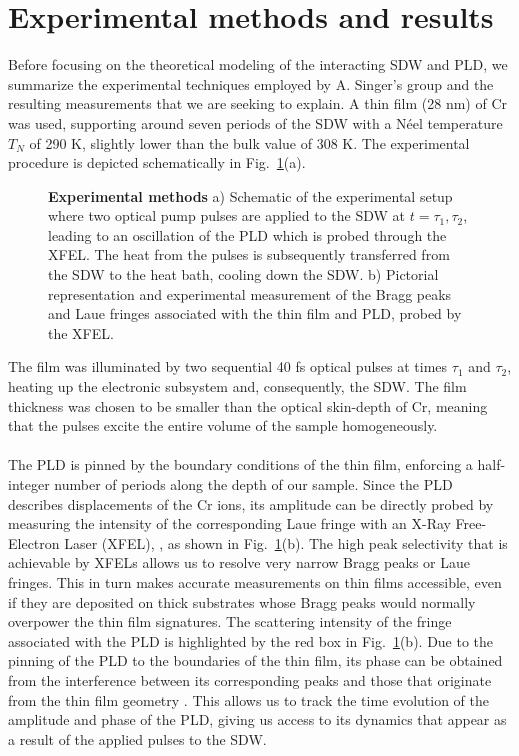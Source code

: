 \section{Experimental methods and results \label{sec:Cr_experiment}}
Before focusing on the theoretical modeling of the interacting SDW and PLD, we summarize the experimental techniques employed by A. Singer's group and the resulting measurements that we are seeking to explain.
A thin film (28 nm) of Cr was used, supporting around seven periods of the SDW with a N\'eel temperature $T_N$ of 290 K, slightly lower than the bulk value of 308 K.
The experimental procedure is depicted schematically in Fig.~\ref{fig:Cr_schematic}(a). 
\begin{figure}[h]
\caption{\label{fig:Cr_schematic}{\bf Experimental methods} a) Schematic of the experimental setup where two optical pump pulses are applied to the SDW at $t=\tau_1,\tau_2$, leading to an oscillation of the PLD which is probed through the XFEL. The heat from the pulses is subsequently transferred from the SDW to the heat bath, cooling down the SDW. b) Pictorial representation and experimental measurement of the Bragg peaks and Laue fringes associated with the thin film and PLD, probed by the XFEL.}
\end{figure}
The film was illuminated by two sequential 40 fs optical pulses at times $\tau_1$ and $\tau_2$, heating up the electronic subsystem and, consequently, the SDW.
The film thickness was chosen to be smaller than the optical skin-depth of Cr, meaning that the pulses excite the entire volume of the sample homogeneously.
\\\\
The PLD is pinned by the boundary conditions of the thin film, enforcing a half-integer number of periods along the depth of our sample.
Since the PLD describes displacements of the Cr ions, its amplitude can be directly probed by measuring the intensity of the corresponding Laue fringe with an X-Ray Free-Electron Laser (XFEL), \cite{Singer2015prb, Singer2015prl}, as shown in Fig.~\ref{fig:Cr_schematic}(b).
The high peak selectivity that is achievable by XFELs allows us to resolve very narrow Bragg peaks or Laue fringes. 
This in turn makes accurate measurements on thin films accessible, even if they are deposited on thick substrates whose Bragg peaks would normally overpower the thin film signatures.
The scattering intensity of the fringe associated with the PLD is highlighted by the red box in Fig.~\ref{fig:Cr_schematic}(b).
Due to the pinning of the PLD to the boundaries of the thin film, its phase can be obtained from the interference between its corresponding peaks and those that originate from the thin film geometry \cite{Singer2015prb}.
This allows us to track the time evolution of the amplitude and phase of the PLD, giving us access to its dynamics that appear as a result of the applied pulses to the SDW.

